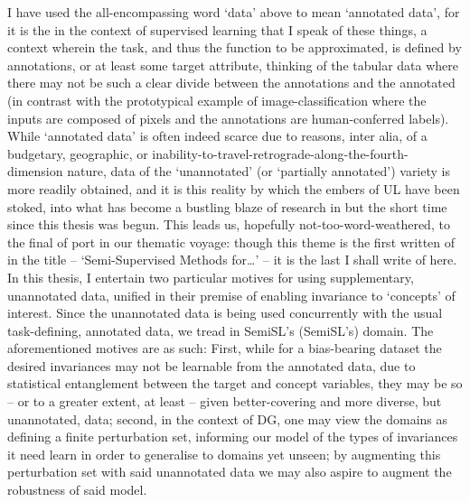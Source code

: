 %
%
I have used the all-encompassing word `data' above to mean `annotated data', for it is the in the
context of supervised learning that I speak of these things, a context wherein the task, and thus
the function to be approximated, is defined by annotations, or at least some target attribute,
thinking of the tabular data where there may not be such a clear divide between the annotations and
the annotated (in contrast with the prototypical example of image-classification where the inputs
are composed of pixels and the annotations are human-conferred labels).
%
While `annotated data' is often indeed scarce due to reasons, inter alia, of a budgetary,
geographic, or inability-to-travel-retrograde-along-the-fourth-dimension nature, data of the
`unannotated' (or `partially annotated') variety is more readily obtained, and it is this reality
by which the embers of \ac{UL} have been stoked, into what has become a bustling blaze of
research in but the short time since this thesis was begun.
%
This leads us, hopefully not-too-word-weathered, to the final of port in our thematic
voyage: though this theme is the first written of in the title -- `Semi-Supervised Methods
for\dots' -- it is the last I shall write of here.
%
In this thesis, I entertain two particular motives for using supplementary, unannotated data,
unified in their premise of enabling invariance to `concepts' of interest.
%
Since the unannotated data is being used concurrently with the usual task-defining, annotated data,
we tread in \acl{SemiSL}'s (\acs{SemiSL}'s) domain.
%
The aforementioned motives are as such:
%
First, while for a bias-bearing dataset the desired invariances may not be learnable from the
annotated data, due to statistical entanglement between the target and concept variables, they may
be so -- or to a greater extent, at least -- given better-covering and more diverse, but
unannotated, data;
%
second, in the context of \ac{DG}, one may view the domains as defining a finite perturbation set,
informing our model of the types of invariances it need learn in order to generalise to domains yet
unseen; by augmenting this perturbation set with said unannotated data we may also aspire to
augment the robustness of said model.

%
